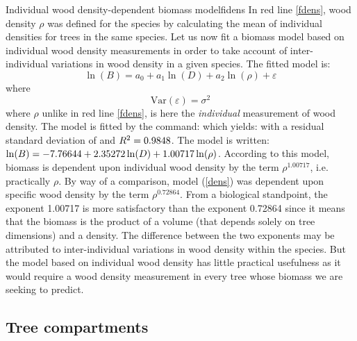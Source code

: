 \begin{filrouge}{Individual wood density-dependent biomass model}{fidens}%
In red line \ref{fdens}, wood density $\rho$ was defined for the species by calculating the mean of individual densities for trees in the same species. Let us now fit a biomass model based on individual wood density measurements in order to take account of inter-individual variations in wood density in a given species. The fitted model is:
\[
\ln(B)=a_0+a_1\ln(D)+a_2\ln(\rho)+\varepsilon
\]
where
\[
\mathrm{Var}(\varepsilon)=\sigma^2
\]
where $\rho$ unlike in red line \ref{fdens}, is here the \emph{individual} measurement of wood density. The model is fitted by the command:
%
which yields:
%
with a residual standard deviation of  and $R^2=\mbox{0.9848}$. The model is written:
$\ln(B)=-\mbox{7.76644}+\mbox{2.35272}\ln(D)+\mbox{1.00717}\ln(\rho)$.
According to this model, biomass is dependent upon individual wood density by the term $\rho^{1.00717}$, i.e. practically $\rho$. By way of a comparison, model (\ref{dens}) was dependent upon specific wood density by the term $\rho^{0.72864}$. From a biological standpoint, the exponent 1.00717 is more satisfactory than the exponent 0.72864 since it means that the biomass is the product of a volume (that depends solely on tree dimensions) and a density. The difference between the two exponents may be attributed to inter-individual variations in wood density within the species. But the model based on individual wood density has little practical usefulness as it would require a wood density measurement in every tree whose biomass we are seeking to predict.
\end{filrouge}

\subsection{Tree compartments\label{cmpt}}

